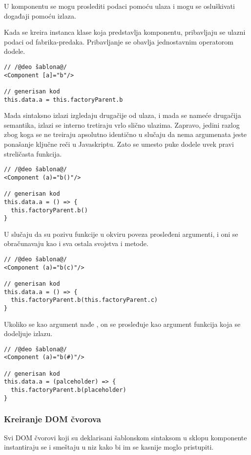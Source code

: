 U komponentu se mogu proslediti podaci pomoću ulaza i mogu se osluškivati događaji pomoću izlaza.

Kada se kreira instanca klase koja predstavlja komponentu, pribavljaju se ulazni podaci od fabrika-predaka.
Pribavljanje se obavlja jednostavnim operatorom dodele.

\begin{lstlisting}
// /@deo šablona@/
<Component [a]="b"/>

// generisan kod
this.data.a = this.factoryParent.b
\end{lstlisting}

Mada sintaksno izlazi izgledaju drugačije od ulaza, i mada se nameće drugačija semantika, izlazi se interno tretiraju vrlo slično ulazima.
Zapravo, jedini razlog zbog koga se ne treiraju apsolutno identično u slučaju da nema argumenata jeste ponašanje ključne reči  u Javaskriptu.
Zato se umesto puke dodele uvek pravi streličasta funkcija.

\begin{lstlisting}
// /@deo šablona@/
<Component (a)="b()"/>

// generisan kod
this.data.a = () => {
  this.factoryParent.b()
}
\end{lstlisting}

U slučaju da su pozivu funkcije u okviru poveza prosleđeni argumenti, i oni se obračunavaju kao i sva ostala svojstva i metode.

\begin{lstlisting}
// /@deo šablona@/
<Component (a)="b(c)"/>

// generisan kod
this.data.a = () => {
  this.factoryParent.b(this.factoryParent.c)
}
\end{lstlisting}

Ukoliko se kao argument nađe \code{\#}, on se prosleđuje kao argument funkcija koja se dodeljuje izlazu.

\begin{lstlisting}
// /@deo šablona@/
<Component (a)="b(#)"/>

// generisan kod
this.data.a = (palceholder) => {
  this.factoryParent.b(placeholder)
}
\end{lstlisting}

\subsubsection{Kreiranje DOM čvorova}
\label{subsubsec:init-part-4}

Svi DOM čvorovi koji su deklarisani šablonskom sintaksom u sklopu komponente instantiraju se i smeštaju u niz kako bi im se kasnije moglo pristupiti.

